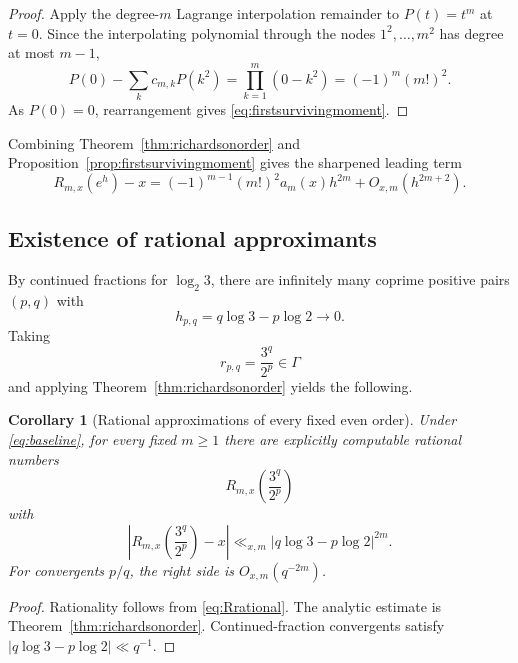 \documentclass[11pt,oneside]{article}
\newtheorem{corollary}[theorem]{Corollary}
\theoremstyle{definition}
\theoremstyle{remark}
\begin{document}
\begin{proof}
Apply the degree-$m$ Lagrange interpolation remainder to $P(t)=t^m$ at $t=0$.  Since the
interpolating polynomial through the nodes $1^2,\dots,m^2$ has degree at most $m-1$,
\[
 P(0)-\sum_kc_{m,k}P(k^2)
 =\prod_{k=1}^m(0-k^2)=(-1)^m(m!)^2.
\]
As $P(0)=0$, rearrangement gives \eqref{eq:firstsurvivingmoment}.
\end{proof}

Combining Theorem~\ref{thm:richardsonorder} and
Proposition~\ref{prop:firstsurvivingmoment} gives the sharpened leading term
\begin{equation}
 R_{m,x}(e^h)-x
 =(-1)^{m-1}(m!)^2a_m(x)h^{2m}+O_{x,m}(h^{2m+2}).
 \label{eq:sharpleading}
\end{equation}

\subsection{Existence of rational approximants}

By continued fractions for $\log_2 3$, there are infinitely many coprime positive pairs
$(p,q)$ with
\begin{equation}
 h_{p,q}=q\log3-p\log2\longrightarrow0.
 \label{eq:hpq}
\end{equation}
Taking
\[
 r_{p,q}=\frac{3^q}{2^p}\in\Gamma
\]
and applying Theorem~\ref{thm:richardsonorder} yields the following.

\begin{corollary}[Rational approximations of every fixed even order]
\label{cor:rationalapproximants}
Under \eqref{eq:baseline}, for every fixed $m\ge1$ there are explicitly computable rational
numbers
\begin{equation}
 R_{m,x}\!\left(\frac{3^q}{2^p}\right)
 \label{eq:explicitrationalapprox}
\end{equation}
with
\begin{equation}
 \left|R_{m,x}\!\left(\frac{3^q}{2^p}\right)-x\right|
 \ll_{x,m}|q\log3-p\log2|^{2m}.
 \label{eq:approxbound}
\end{equation}
For convergents $p/q$, the right side is $O_{x,m}(q^{-2m})$.
\end{corollary}

\begin{proof}
Rationality follows from \eqref{eq:Rrational}.  The analytic estimate is
Theorem~\ref{thm:richardsonorder}.  Continued-fraction convergents satisfy
$|q\log3-p\log2|\ll q^{-1}$.
\end{proof}
\end{document}
